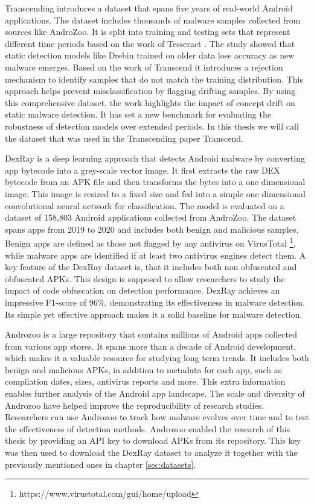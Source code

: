 Transcending \cite{transcending} introduces a dataset that spans five years of real-world Android applications. 
The dataset includes thousands of malware samples collected from sources like AndroZoo. 
It is split into training and testing sets that represent different time periods based on the work of Tesseract \cite{tesseract}.
The study showed that static detection models like Drebin trained on older data lose accuracy as new malware emerges. 
Based on the work of Transcend \cite{transcend} it introduces a rejection mechanism to identify samples that do not match the training distribution. 
This approach helps prevent misclassification by flagging drifting samples. 
By using this comprehensive dataset, the work highlights the impact of concept drift on static malware detection. 
It has set a new benchmark for evaluating the robustness of detection models over extended periods.
In this thesis we will call the dataset that was used in the Transcending paper Transcend.

DexRay \cite{dexray} is a deep learning approach that detects Android malware by converting app bytecode into a grey-scale vector image. 
It first extracts the raw DEX bytecode from an APK file and then transforms the bytes into a one dimensional image. 
This image is resized to a fixed size and fed into a simple one dimensional convolutional neural network for classification. 
The model is evaluated on a dataset of 158,803 Android applications collected from AndroZoo. 
The dataset spans apps from 2019 to 2020 and includes both benign and malicious samples. 
Benign apps are defined as those not flagged by any antivirus on VirusTotal \footnote{https://www.virustotal.com/gui/home/upload}, 
while malware apps are identified if at least two antivirus engines detect them. 
A key feature of the DexRay dataset is, that it includes both non obfuscated and obfuscated APKs. 
This design is supposed to allow researchers to study the impact of code obfuscation on detection performance. 
DexRay achieves an impressive F1-score of 96\%, demonstrating its effectiveness in malware detection. 
Its simple yet effective approach makes it a solid baseline for malware detection.

Androzoo \cite{androzoo} is a large repository that contains millions of Android apps collected from various app stores. 
It spans more than a decade of Android development, which makes it a valuable resource for studying long term trends. 
It includes both benign and malicious APKs, in addition to metadata for each app, such as compilation dates, sizes, antivirus reports and more. 
This extra information enables further analysis of the Android app landscape.
The scale and diversity of Androzoo have helped improve the reproducibility of research studies. 
Researchers can use Androzoo to track how malware evolves over time and to test the effectiveness of detection methods.
Androzoo enabled the research of this thesis by providing an API key to download APKs from its repository.
This key was then used to download the DexRay dataset to analyze it together with the previously mentioned ones in chapter \ref{sec:datasets}.

